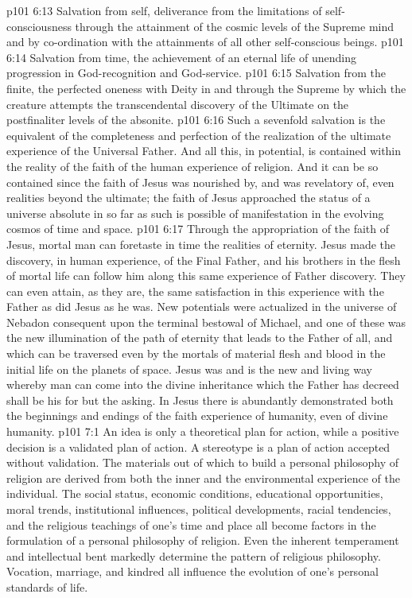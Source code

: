 \vs p101 6:13 \pc {}\bibnobreakspace Salvation from self, deliverance from the limitations of self\hyp{}consciousness through the attainment of the cosmic levels of the Supreme mind and by co\hyp{}ordination with the attainments of all other self\hyp{}conscious beings.
\vs p101 6:14 \pc {}\bibnobreakspace Salvation from time, the achievement of an eternal life of unending progression in God\hyp{}recognition and God\hyp{}service.
\vs p101 6:15 \pc {}\bibnobreakspace Salvation from the finite, the perfected oneness with Deity in and through the Supreme by which the creature attempts the transcendental discovery of the Ultimate on the postfinaliter levels of the absonite.
\vs p101 6:16 \pc Such a sevenfold salvation is the equivalent of the completeness and perfection of the realization of the ultimate experience of the Universal Father. And all this, in potential, is contained within the reality of the faith of the human experience of religion. And it can be so contained since the faith of Jesus was nourished by, and was revelatory of, even realities beyond the ultimate; the faith of Jesus approached the status of a universe absolute in so far as such is possible of manifestation in the evolving cosmos of time and space.
\vs p101 6:17 Through the appropriation of the faith of Jesus, mortal man can foretaste in time the realities of eternity. Jesus made the discovery, in human experience, of the Final Father, and his brothers in the flesh of mortal life can follow him along this same experience of Father discovery. They can even attain, as they are, the same satisfaction in this experience with the Father as did Jesus as he was. New potentials were actualized in the universe of Nebadon consequent upon the terminal bestowal of Michael, and one of these was the new illumination of the path of eternity that leads to the Father of all, and which can be traversed even by the mortals of material flesh and blood in the initial life on the planets of space. Jesus was and is the new and living way whereby man can come into the divine inheritance which the Father has decreed shall be his for but the asking. In Jesus there is abundantly demonstrated both the beginnings and endings of the faith experience of humanity, even of divine humanity.
\vs p101 7:1 An idea is only a theoretical plan for action, while a positive decision is a validated plan of action. A stereotype is a plan of action accepted without validation. The materials out of which to build a personal philosophy of religion are derived from both the inner and the environmental experience of the individual. The social status, economic conditions, educational opportunities, moral trends, institutional influences, political developments, racial tendencies, and the religious teachings of one’s time and place all become factors in the formulation of a personal philosophy of religion. Even the inherent temperament and intellectual bent markedly determine the pattern of religious philosophy. Vocation, marriage, and kindred all influence the evolution of one’s personal standards of life.
